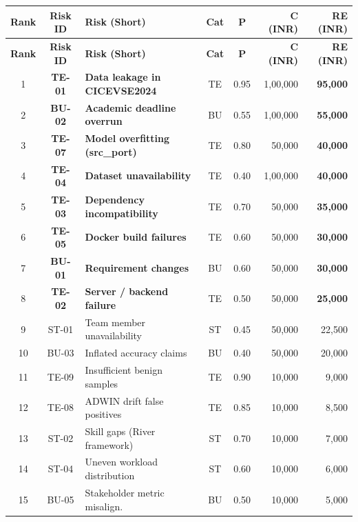 \documentclass[11pt, a4paper]{article}
\begin{document}
\small
\begin{longtable}{|c|c|p{4.5cm}|c|c|r|r|}
\hline
\rowcolor{lightgray}
\textbf{Rank} & \textbf{Risk ID} & \textbf{Risk (Short)} & \textbf{Cat} & \textbf{P} & \textbf{C (INR)} & \textbf{RE (INR)} \\
\hline
\endfirsthead
\hline
\rowcolor{lightgray}
\textbf{Rank} & \textbf{Risk ID} & \textbf{Risk (Short)} & \textbf{Cat} & \textbf{P} & \textbf{C (INR)} & \textbf{RE (INR)} \\
\hline
\endhead

\rowcolor{red!12}
1 & \textbf{TE-01} & \textbf{Data leakage in CICEVSE2024} & TE & 0.95 & 1,00,000 & \textbf{95,000} \\
\hline
\rowcolor{red!10}
2 & \textbf{BU-02} & \textbf{Academic deadline overrun} & BU & 0.55 & 1,00,000 & \textbf{55,000} \\
\hline
\rowcolor{red!8}
3 & \textbf{TE-07} & \textbf{Model overfitting (src\_port)} & TE & 0.80 & 50,000 & \textbf{40,000} \\
\hline
\rowcolor{red!8}
4 & \textbf{TE-04} & \textbf{Dataset unavailability} & TE & 0.40 & 1,00,000 & \textbf{40,000} \\
\hline
\rowcolor{orange!10}
5 & \textbf{TE-03} & \textbf{Dependency incompatibility} & TE & 0.70 & 50,000 & \textbf{35,000} \\
\hline
\rowcolor{orange!8}
6 & \textbf{TE-05} & \textbf{Docker build failures} & TE & 0.60 & 50,000 & \textbf{30,000} \\
\hline
\rowcolor{orange!8}
7 & \textbf{BU-01} & \textbf{Requirement changes} & BU & 0.60 & 50,000 & \textbf{30,000} \\
\hline
\rowcolor{orange!6}
8 & \textbf{TE-02} & \textbf{Server / backend failure} & TE & 0.50 & 50,000 & \textbf{25,000} \\
\hline
9 & ST-01 & Team member unavailability & ST & 0.45 & 50,000 & 22,500 \\
\hline
10 & BU-03 & Inflated accuracy claims & BU & 0.40 & 50,000 & 20,000 \\
\hline
11 & TE-09 & Insufficient benign samples & TE & 0.90 & 10,000 & 9,000 \\
\hline
12 & TE-08 & ADWIN drift false positives & TE & 0.85 & 10,000 & 8,500 \\
\hline
13 & ST-02 & Skill gaps (River framework) & ST & 0.70 & 10,000 & 7,000 \\
\hline
14 & ST-04 & Uneven workload distribution & ST & 0.60 & 10,000 & 6,000 \\
\hline
15 & BU-05 & Stakeholder metric misalign. & BU & 0.50 & 10,000 & 5,000 \\

\end{longtable}
\end{document}

